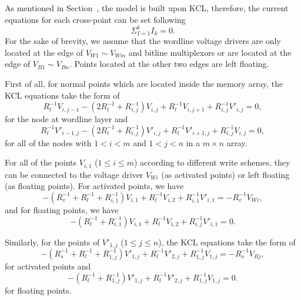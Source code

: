 \label{sec:app}

As mentioned in Section~\label{sec:model}, the model is built upon KCL,
therefore, the current equations for each cross-point can be set following
\begin{equation}\label{equ:KCL0}
 {\Sigma}_{I=1}^kI_k=0.
\end{equation}
For the sake of brevity, we assume that the wordline voltage drivers are
only located at the edge of $V_{W1} \sim V_{Wm}$ and bitline multiplexors
or are located at the edge of $V_{B1} \sim V_{Bn}$. Points located at the
other two edges are left floating.

First of all, for normal points which are located inside the memory array,
the KCL equations take the form of
\begin{equation}\label{equ:KCL1}
R_l^{-1}V_{i,j-1} -(2R_l^{-1}+R_{i,j}^{-1})V_{i,j}+ R_l^{-1}V_{i,j+1}+R_{i,j}^{-1}V'_{i,j}=0,
\end{equation}
for the node at wordline layer and
\begin{equation}\label{equ:KCL2}
R_l^{-1}V'_{i-1,j} -(2R_l^{-1}+R_{i,j}^{-1})V'_{i,j}+ R_l^{-1}V'_{i+1,j}+R_{i,j}^{-1}V_{i,j}=0,
\end{equation}
for all of the nodes with $1<i<m$ and $1<j<n$ in a $m \times n$ array.

For all of the points $V_{i,1}$ ($1\leq i\leq m$) according to different
write schemes, they can be connected to the voltage driver $V_{Wi}$ (as
activated points) or left floating (as floating points). For activated
points, we have
\begin{equation}\label{equ:KCL3}
 -(R_v^{-1}+R_l^{-1}+R_{i,1}^{-1})V_{i,1}+ R_l^{-1}V_{i,2}+R_{i,1}^{-1}V'_{i,1}=-R_v^{-1}V_{Wi},
\end{equation}
and for floating points, we have
\begin{equation}\label{equ:KCL4}
 -(R_l^{-1}+R_{i,1}^{-1})V_{i,1}+ R_l^{-1}V_{i,2}+R_{i,j}^{-1}V'_{i,1}=0.
\end{equation}

Similarly, for the points of $V'_{1,j}$ ($1\leq j\leq n$), the KCL
equations take the form of
\begin{equation}\label{equ:KCL5}
 -(R_s^{-1}+R_l^{-1}+R_{1,j}^{-1})V'_{1,j}+ R_l^{-1}V'_{2,j}+R_{1,j}^{-1}V_{1,j}=-R_s^{-1}V_{Bj},
\end{equation}
for activated points and
\begin{equation}\label{equ:KCL6}
 -(R_l^{-1}+R_{1,j}^{-1})V'_{1,j}+ R_l^{-1}V'_{2,j}+R_{1,j}^{-1}V_{1,j}=0.
\end{equation}
for floating points.

